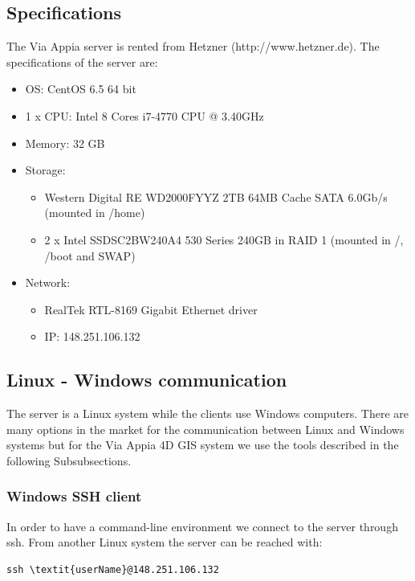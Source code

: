 \documentclass[a4paper,11pt]{article}
\begin{document}
\subsection{Specifications}

The Via Appia server is rented from Hetzner (http://www.hetzner.de). The specifications of the server are:

\begin{itemize}
\item OS: CentOS 6.5 64 bit
\item 1 x CPU: Intel 8 Cores i7-4770 CPU @ 3.40GHz
\item Memory: 32 GB
\item Storage:
\begin{itemize}
\item Western Digital RE WD2000FYYZ 2TB 64MB Cache SATA 6.0Gb/s (mounted in /home)
\item 2 x Intel SSDSC2BW240A4 530 Series 240GB in RAID 1 (mounted in /, /boot and SWAP)
\end{itemize}
\item Network: 
\begin{itemize}
\item RealTek RTL-8169 Gigabit Ethernet driver
\item IP: 148.251.106.132
\end{itemize}
\end{itemize}

\subsection{Linux - Windows communication}
\label{sec:com}
The server is a Linux system while the clients use Windows computers. There are many options in the market for the communication between Linux and Windows systems but for the Via Appia 4D GIS system we use the tools described in the following Subsubsections.

\subsubsection{Windows SSH client}
\label{sec:putty}

In order to have a command-line environment we connect to the server through ssh. From another Linux system the server can be reached with:

\begin{Verbatim}[fontfamily=courier,commandchars=\\\{\},fontsize=\footnotesize]
ssh \textit{userName}@148.251.106.132
\end{Verbatim}
\end{document}

